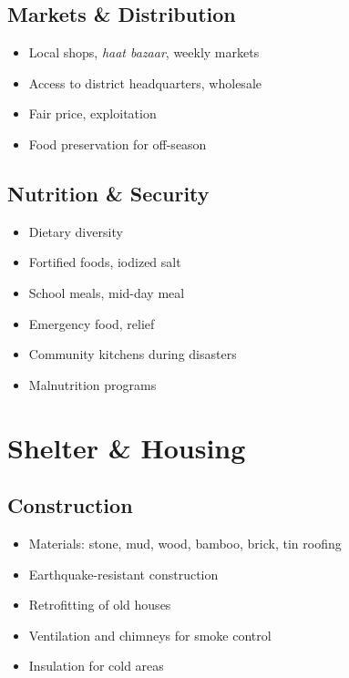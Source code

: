 \documentclass[11pt,a4paper]{article}
\begin{document}
\subsection{Markets \& Distribution}
\begin{itemize}
    \item Local shops, \textit{haat bazaar}, weekly markets
    \item Access to district headquarters, wholesale
    \item Fair price, exploitation
    \item Food preservation for off-season
\end{itemize}

\subsection{Nutrition \& Security}
\begin{itemize}
    \item Dietary diversity
    \item Fortified foods, iodized salt
    \item School meals, mid-day meal
    \item Emergency food, relief
    \item Community kitchens during disasters
    \item Malnutrition programs
\end{itemize}

\section{Shelter \& Housing}

\subsection{Construction}
\begin{itemize}
    \item Materials: stone, mud, wood, bamboo, brick, tin roofing
    \item Earthquake-resistant construction
    \item Retrofitting of old houses
    \item Ventilation and chimneys for smoke control
    \item Insulation for cold areas
\end{itemize}
\end{document}
